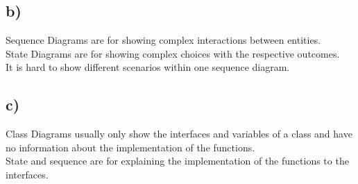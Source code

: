 \documentclass[a4paper,10pt]{scrartcl}[2003/01/01]
\begin{document}
        \subsection*{b)}
        Sequence Diagrams are for showing complex interactions between entities.\\
        State Diagrams are for showing complex choices with the respective outcomes.\\
        
        It is hard to show different scenarios within one sequence diagram.
        \subsection*{c)}
        Class Diagrams usually only show the interfaces and variables of a class and have no information about the implementation of the functions.\\
        State and sequence are for explaining the implementation of the functions to the interfaces.
\end{document}
